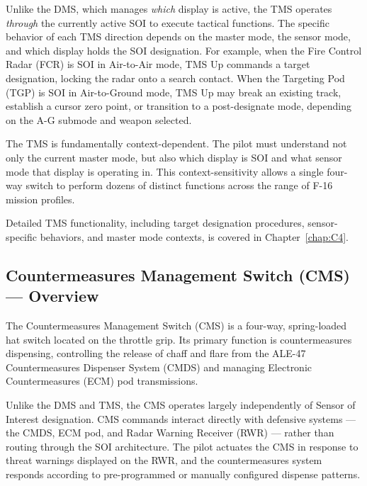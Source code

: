 \documentclass[11pt, a4paper, twoside]{report}
\begin{document}
Unlike the DMS, which manages \textit{which} display is active, the TMS operates \textit{through} the currently active SOI to execute tactical functions. The specific behavior of each TMS direction depends on the master mode, the sensor mode, and which display holds the SOI designation. For example, when the Fire Control Radar (FCR) is SOI in Air-to-Air mode, TMS Up commands a target designation, locking the radar onto a search contact. When the Targeting Pod (TGP) is SOI in Air-to-Ground mode, TMS Up may break an existing track, establish a cursor zero point, or transition to a post-designate mode, depending on the A-G submode and weapon selected.

The TMS is fundamentally context-dependent. The pilot must understand not only the current master mode, but also which display is SOI and what sensor mode that display is operating in. This context-sensitivity allows a single four-way switch to perform dozens of distinct functions across the range of F-16 mission profiles.

Detailed TMS functionality, including target designation procedures, sensor-specific behaviors, and master mode contexts, is covered in Chapter~\ref{chap:C4}.


\subsection{Countermeasures Management Switch (CMS) — Overview}
\label{sec:C2-S3-S3}

The Countermeasures Management Switch (CMS) is a four-way, spring-loaded hat switch located on the throttle grip. Its primary function is countermeasures dispensing, controlling the release of chaff and flare from the ALE-47 Countermeasures Dispenser System (CMDS) and managing Electronic Countermeasures (ECM) pod transmissions.

Unlike the DMS and TMS, the CMS operates largely independently of Sensor of Interest designation. CMS commands interact directly with defensive systems — the CMDS, ECM pod, and Radar Warning Receiver (RWR) — rather than routing through the SOI architecture. The pilot actuates the CMS in response to threat warnings displayed on the RWR, and the countermeasures system responds according to pre-programmed or manually configured dispense patterns.
\end{document}

